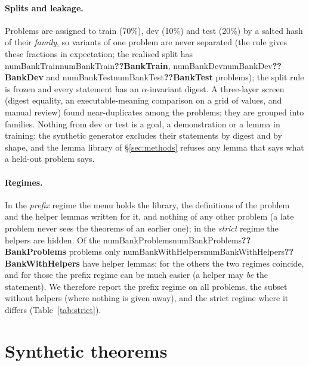 \documentclass[10pt]{article}
\newcommand{\N}[1]{\ifcsname num#1\endcsname\csname num#1\endcsname\else\textbf{??#1}\fi}          %
\begin{document}
\paragraph{Splits and leakage.}
Problems are assigned to train (70\%), dev (10\%) and test (20\%) by a salted hash of their \emph{family}, so variants of one problem are never separated (the rule gives these fractions in expectation; the realised split has \N{BankTrain}, \N{BankDev} and \N{BankTest} problems); the split rule is frozen and every statement has an $\alpha$-invariant digest.
A three-layer screen (digest equality, an executable-meaning comparison on a grid of values, and manual review) found near-duplicates among the problems; they are grouped into families.
Nothing from dev or test is a goal, a demonstration or a lemma in training: the synthetic generator excludes their statements by digest and by shape, and the lemma library of \S\ref{sec:methods} refuses any lemma that says what a held-out problem says.

\paragraph{Regimes.}
In the \emph{prefix} regime the menu holds the library, the definitions of the problem and the helper lemmas written for it, and nothing of any other problem (a late problem never sees the theorems of an earlier one); in the \emph{strict} regime the helpers are hidden. Of the \N{BankProblems} problems only \N{BankWithHelpers} have helper lemmas; for the others the two regimes coincide, and for those the prefix regime can be much easier (a helper may \emph{be} the statement).
We therefore report the prefix regime on all problems, the subset without helpers (where nothing is given away), and the strict regime where it differs (Table~\ref{tab:strict}).

\section{Synthetic theorems}\label{sec:synth}
\end{document}
